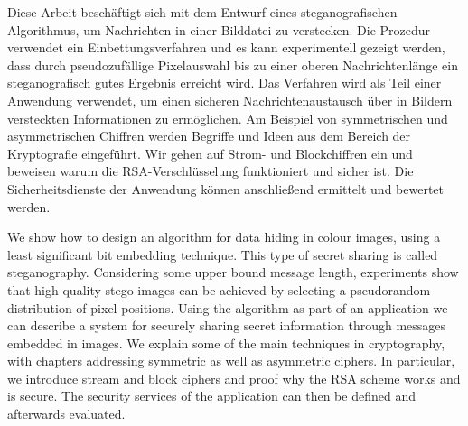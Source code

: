 \newenvironment{abstractpage}
{\cleardoublepage\vspace*{\fill}\thispagestyle{empty}}
{\vfill\cleardoublepage}
\newenvironment{myabstract}[1]
{\bigskip\selectlanguage{#1}
  \begin{center}
    \bfseries\abstractname
  \end{center}}
{\par\bigskip}

\begin{abstractpage}
  \begin{myabstract}{german}
    Diese Arbeit beschäftigt sich mit dem Entwurf eines steganografischen Algorithmus, um
    Nachrichten in einer Bilddatei zu verstecken.
    Die Prozedur verwendet ein  Einbettungsverfahren und es
    kann experimentell gezeigt werden, dass durch pseudozufällige
    Pixelauswahl bis zu einer oberen Nachrichtenlänge ein
    steganografisch gutes Ergebnis erreicht wird.
    Das Verfahren wird als Teil einer Anwendung verwendet,
    um einen sicheren Nachrichtenaustausch über in Bildern versteckten
    Informationen zu ermöglichen. Am Beispiel von
    symmetrischen und asymmetrischen Chiffren werden Begriffe und Ideen
    aus dem Bereich der Kryptografie eingeführt. Wir gehen auf
    Strom- und Blockchiffren ein und beweisen warum die
    RSA-Verschlüsselung funktioniert und sicher ist.
    Die Sicherheitsdienste der Anwendung können anschließend ermittelt
    und bewertet werden.
  \end{myabstract}
  \begin{myabstract}{english}
    We show how to design an algorithm for data hiding in colour images,
    using a least significant bit embedding technique.
    This type of secret sharing is called steganography.
    Considering some upper bound message length,
    experiments show that high-quality stego-images can be achieved
    by selecting a pseudorandom distribution of pixel positions.
    Using the algorithm as part of an application we can describe a system
    for securely sharing secret information through messages embedded in images.
    We explain some of the main techniques in cryptography, with chapters
    addressing symmetric as well as asymmetric ciphers.
    In particular, we introduce stream and block ciphers and proof why the
    RSA scheme works and is secure. The security services of the
    application can then be defined and afterwards evaluated.
  \end{myabstract}
\end{abstractpage}